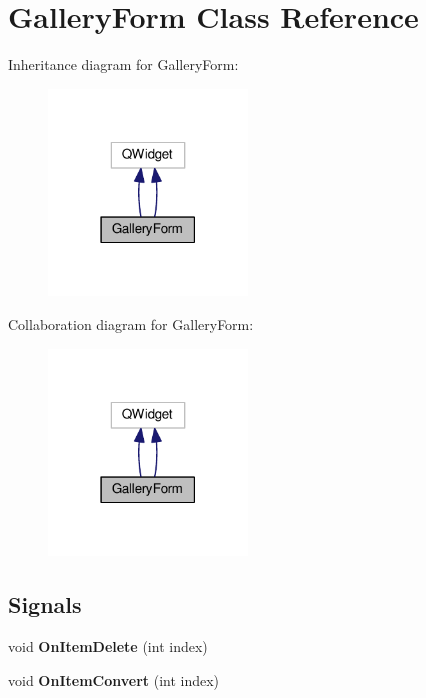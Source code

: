 \hypertarget{class_gallery_form}{}\section{Gallery\+Form Class Reference}
\label{class_gallery_form}


Inheritance diagram for Gallery\+Form\+:\nopagebreak
\begin{figure}[H]
\begin{center}
\leavevmode
\includegraphics[width=150pt]{class_gallery_form__inherit__graph}
\end{center}
\end{figure}


Collaboration diagram for Gallery\+Form\+:\nopagebreak
\begin{figure}[H]
\begin{center}
\leavevmode
\includegraphics[width=150pt]{class_gallery_form__coll__graph}
\end{center}
\end{figure}
\subsection*{Signals}
\begin{DoxyCompactItemize}
\item 
void {\bfseries On\+Item\+Delete} (int index)\hypertarget{class_gallery_form_addfd9450a0d74d1539e2668623199198}{}\label{class_gallery_form_addfd9450a0d74d1539e2668623199198}

\item 
void {\bfseries On\+Item\+Convert} (int index)\hypertarget{class_gallery_form_a988796418cca1e4ad61d7d3e7c4da3fb}{}\label{class_gallery_form_a988796418cca1e4ad61d7d3e7c4da3fb}

\end{DoxyCompactItemize}
